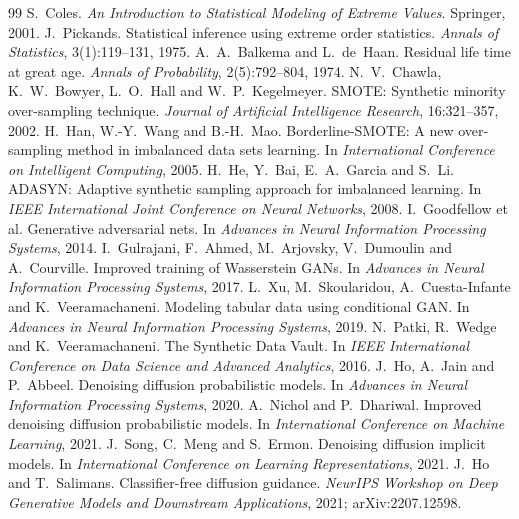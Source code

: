 \documentclass[11pt,a4paper]{article}
\begin{document}
\begin{thebibliography}{99}
 S.~Coles. \textit{An Introduction to Statistical Modeling of Extreme Values}. Springer, 2001.
 J.~Pickands. Statistical inference using extreme order statistics.
  \textit{Annals of Statistics}, 3(1):119--131, 1975.
 A.~A.~Balkema and L.~de~Haan. Residual life time at great age.
  \textit{Annals of Probability}, 2(5):792--804, 1974.
 N.~V.~Chawla, K.~W.~Bowyer, L.~O.~Hall and W.~P.~Kegelmeyer. SMOTE: Synthetic minority
  over-sampling technique. \textit{Journal of Artificial Intelligence Research}, 16:321--357, 2002.
 H.~Han, W.-Y.~Wang and B.-H.~Mao. Borderline-SMOTE: A new over-sampling method in
  imbalanced data sets learning. In \textit{International Conference on Intelligent Computing}, 2005.
 H.~He, Y.~Bai, E.~A.~Garcia and S.~Li. ADASYN: Adaptive synthetic sampling approach for
  imbalanced learning. In \textit{IEEE International Joint Conference on Neural Networks}, 2008.
 I.~Goodfellow et al. Generative adversarial nets. In \textit{Advances in Neural
  Information Processing Systems}, 2014.
 I.~Gulrajani, F.~Ahmed, M.~Arjovsky, V.~Dumoulin and A.~Courville. Improved training
  of Wasserstein GANs. In \textit{Advances in Neural Information Processing Systems}, 2017.
 L.~Xu, M.~Skoularidou, A.~Cuesta-Infante and K.~Veeramachaneni. Modeling tabular data using
  conditional GAN. In \textit{Advances in Neural Information Processing Systems}, 2019.
 N.~Patki, R.~Wedge and K.~Veeramachaneni. The Synthetic Data Vault. In \textit{IEEE
  International Conference on Data Science and Advanced Analytics}, 2016.
 J.~Ho, A.~Jain and P.~Abbeel. Denoising diffusion probabilistic models. In \textit{Advances in
  Neural Information Processing Systems}, 2020.
 A.~Nichol and P.~Dhariwal. Improved denoising diffusion probabilistic models. In
  \textit{International Conference on Machine Learning}, 2021.
 J.~Song, C.~Meng and S.~Ermon. Denoising diffusion implicit models. In
  \textit{International Conference on Learning Representations}, 2021.
 J.~Ho and T.~Salimans. Classifier-free diffusion guidance. \textit{NeurIPS Workshop on Deep
  Generative Models and Downstream Applications}, 2021; arXiv:2207.12598.

\end{thebibliography}
\end{document}
